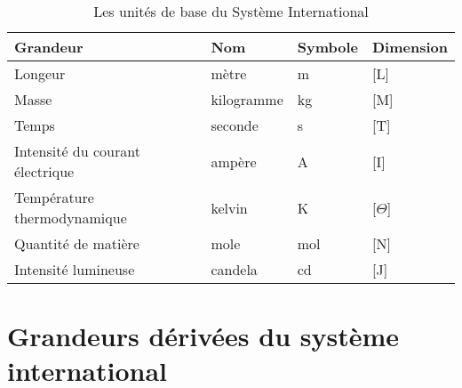 \begin{table}[!h]
    \centering
    \begin{tabular}{@{}P{6cm}P{2.5cm}P{2.5cm}P{2.5cm}@{}}
        \toprule
        Grandeur & Nom & Symbole & Dimension \\
        \midrule
        Longeur & mètre & \si{\meter} & [L] \\
        Masse & kilogramme & \si{\kilogram} & [M] \\
        Temps & seconde & \si{\second} & [T] \\
        Intensité du courant électrique & ampère & \si{\ampere} & [I] \\
        Température thermodynamique & kelvin & \si{\kelvin} & [$\Theta$] \\
        Quantité de matière & mole & \si{\mole} & [N] \\
        Intensité lumineuse & candela & \si{\candela} & [J] \\
        \bottomrule
    \end{tabular}
    \caption{Les unités de base du Système International}
\end{table}

\newpage
\section*{Grandeurs dérivées du système international}

